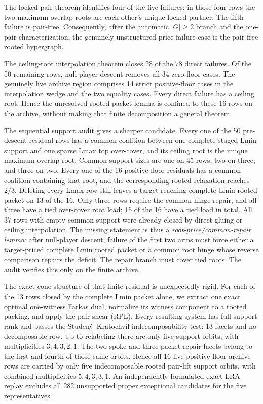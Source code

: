 \documentclass[11pt]{article}
\begin{document}
The locked-pair theorem identifies four of the five failures: in those four
rows the two maximum-overlap roots are each other's unique locked partner.
The fifth failure is pair-free.  Consequently, after the automatic
$|G|\ge2$ branch and the one-pair characterization, the genuinely
unstructured price-failure case is the pair-free rooted hypergraph.

The ceiling-root interpolation theorem closes 28 of the 78 direct failures.
Of the 50 remaining rows, null-player descent removes all 34 zero-floor
cases.  The genuinely live archive region comprises 14 strict positive-floor
cases in the interpolation wedge and the two equality cases.  Every direct
failure has a ceiling root.  Hence the unresolved rooted-packet lemma is
confined to these 16 rows on the archive, without making that finite
decomposition a general theorem.

The sequential support audit gives a sharper candidate.  Every one of the 50
pre-descent residual rows has a common coalition between one complete staged
Lmin support and one sparse Lmax top over-cover, and its ceiling root is the
unique maximum-overlap root.  Common-support sizes are one on 45 rows, two on
three, and three on two.  Every one of the 16 positive-floor residuals has a
common coalition containing that root, and the corresponding rooted
relaxation reaches $2/3$.  Deleting every Lmax row still leaves a
target-reaching complete-Lmin rooted packet on 13 of the 16.  Only three
rows require the common-hinge repair, and all three have a tied over-cover
root load; 15 of the 16 have a tied load in total.  All 37 rows with empty
common support were already closed by direct gluing or ceiling interpolation.
The missing statement is thus a \emph{root-price/common-repair lemma}: after
null-player descent, failure of the first two arms must force either a
target-priced complete Lmin rooted packet or a common root hinge whose
reverse comparison repairs the deficit.  The repair branch must cover tied
roots.  The audit verifies this only on the finite archive.

The exact-cone structure of that finite residual is unexpectedly rigid.
For each of the 13 rows closed by the complete Lmin packet alone, we extract
one exact optimal one-witness Farkas dual, normalize its witness component to
a rooted packing, and apply the pair shear (RPL).  Every resulting system has
full support rank and passes the Studen\'y--Kratochv\'il indecomposability
test: 13 facets and no decomposable row.  Up to relabeling there are only five
support orbits, with multiplicities $3,4,3,2,1$.  The two-spoke and
three-packet repair facets belong to the first and fourth of those same
orbits.  Hence all 16 live positive-floor archive rows are carried by only
five indecomposable rooted pair-lift support orbits, with combined
multiplicities $5,4,3,3,1$.  An independently formulated exact-LRA replay
excludes all 282 unsupported proper exceptional candidates for the five
representatives.
\end{document}
